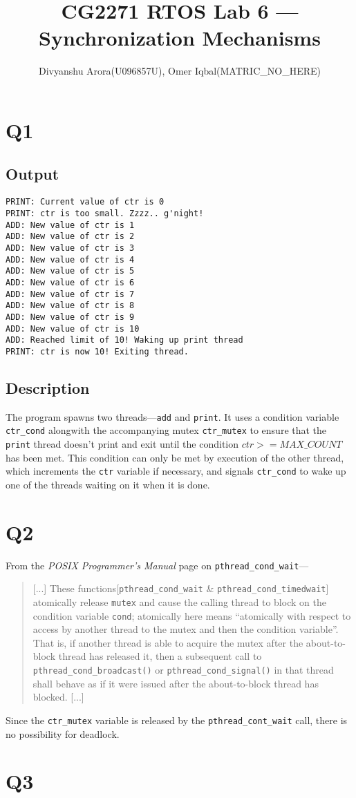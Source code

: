 \documentclass[runningheads,a4paper]{report}
\title{CG2271 RTOS Lab 6 --- Synchronization Mechanisms}
\author{Divyanshu Arora(U096857U), Omer Iqbal(MATRIC\_NO\_HERE)}
\begin{document}
\maketitle
\section*{Q1}
\subsection{Output}
\begin{lstlisting}
PRINT: Current value of ctr is 0
PRINT: ctr is too small. Zzzz.. g'night!
ADD: New value of ctr is 1
ADD: New value of ctr is 2
ADD: New value of ctr is 3
ADD: New value of ctr is 4
ADD: New value of ctr is 5
ADD: New value of ctr is 6
ADD: New value of ctr is 7
ADD: New value of ctr is 8
ADD: New value of ctr is 9
ADD: New value of ctr is 10
ADD: Reached limit of 10! Waking up print thread
PRINT: ctr is now 10! Exiting thread.
\end{lstlisting}

\subsection{Description}

The program spawns two threads---\texttt{add} and \texttt{print}. It
uses a condition variable \texttt{ctr\_cond} alongwith the
accompanying mutex \texttt{ctr\_mutex} to ensure that the
\texttt{print} thread doesn't print and exit until the condition
$ctr>=MAX\_COUNT$ has been met.
This condition can only be met by execution of the other thread, which
increments the \texttt{ctr} variable if necessary, and signals
\texttt{ctr\_cond} to wake up one of the threads waiting on it when it
is done.

\section*{Q2}

From the \textit{POSIX Programmer's Manual} page on
\texttt{pthread\_cond\_wait}---
\begin{quotation}
[...]
These functions[\texttt{pthread\_cond\_wait} \& \texttt{pthread\_cond\_timedwait}] atomically release \texttt{mutex}
  and cause the calling thread to block on the condition variable
  \texttt{cond}; atomically here means ``atomically with respect to access by another thread to the mutex and  then  the  condition
       variable''.  That  is, if another thread is able to acquire the mutex after the about-to-block thread has released it, then a subsequent call to \texttt{pthread\_cond\_broadcast()} or \texttt{pthread\_cond\_signal()} in that thread shall behave as
       if it were issued after the about-to-block thread has blocked. [...]
\end{quotation}

Since the \texttt{ctr\_mutex} variable is released by the
\texttt{pthread\_cont\_wait} call, there is no possibility for
deadlock.

\section*{Q3}
\end{document}
